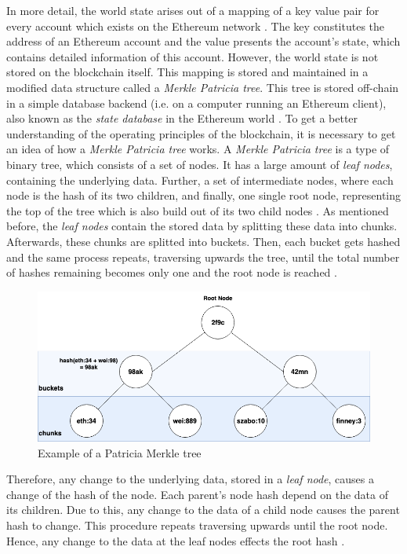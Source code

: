 In more detail, the world state arises out of a mapping of a key value pair for every account which exists on the Ethereum network . The key constitutes the address of an Ethereum account and the value presents the account's state, which contains detailed information of this account. 
However, the world state is not stored on the blockchain itself. This mapping is stored and maintained in a modified data structure called a \textit{Merkle Patricia tree}. This tree is stored off-chain in a simple database backend (i.e. on a computer running an Ethereum client), also known as the \textit{state database} in the Ethereum world . To get a better understanding of the operating principles of the blockchain, it is necessary to get an idea of how a \textit{Merkle Patricia tree} works. A \textit{Merkle Patricia tree} is a type of binary tree, which consists of a set of nodes. It has a large amount of 
\textit{leaf nodes}, containing the underlying data. Further, a set of intermediate nodes, where each node is the hash of its two children, and finally, one single root node, representing the top of the tree which is also build out of its two child nodes  .
As mentioned before, the \textit{leaf nodes} contain the stored data by splitting these data into chunks. Afterwards, these chunks are splitted into buckets. Then, each bucket gets hashed and the same process repeats, traversing upwards the tree, until the total number of hashes remaining becomes only one and the root node is reached . 

\begin{figure}[htbp]
	\centering
	\includegraphics[width=.75\linewidth]{./figures/merkle_tree.png}
	\caption{Example of a Patricia Merkle tree}
	\label{figure:merkle_tree}
\end{figure}

Therefore, any change to the underlying data, stored in a \textit{leaf node}, causes a change of the hash of the node. Each parent's node hash depend on the data of its children. Due to this, any change to the data of a child node causes the parent hash to change. This procedure repeats traversing upwards until the root node. Hence, any change to the data at the leaf nodes effects the root hash . 

